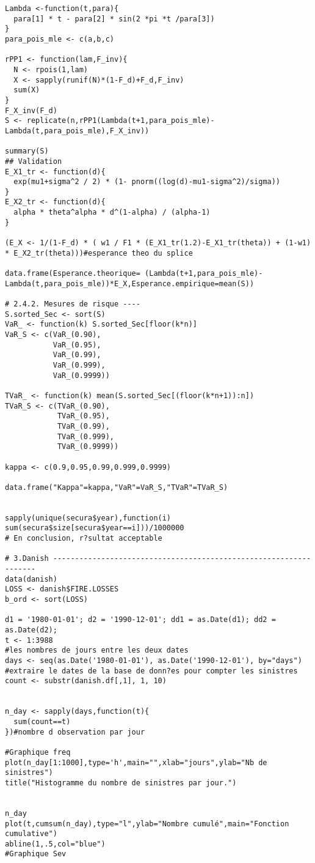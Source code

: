 \begin{verbatim}
Lambda <-function(t,para){
  para[1] * t - para[2] * sin(2 *pi *t /para[3])
}
para_pois_mle <- c(a,b,c)

rPP1 <- function(lam,F_inv){
  N <- rpois(1,lam)
  X <- sapply(runif(N)*(1-F_d)+F_d,F_inv)
  sum(X)
}
F_X_inv(F_d)
S <- replicate(n,rPP1(Lambda(t+1,para_pois_mle)-Lambda(t,para_pois_mle),F_X_inv))

summary(S)
## Validation
E_X1_tr <- function(d){
  exp(mu1+sigma^2 / 2) * (1- pnorm((log(d)-mu1-sigma^2)/sigma))
}
E_X2_tr <- function(d){
  alpha * theta^alpha * d^(1-alpha) / (alpha-1)
}

(E_X <- 1/(1-F_d) * ( w1 / F1 * (E_X1_tr(1.2)-E_X1_tr(theta)) + (1-w1) * E_X2_tr(theta)))#esperance theo du splice

data.frame(Esperance.theorique= (Lambda(t+1,para_pois_mle)-Lambda(t,para_pois_mle))*E_X,Esperance.empirique=mean(S))

# 2.4.2. Mesures de risque ----
S.sorted_Sec <- sort(S)
VaR_ <- function(k) S.sorted_Sec[floor(k*n)]
VaR_S <- c(VaR_(0.90),
           VaR_(0.95),
           VaR_(0.99),
           VaR_(0.999),
           VaR_(0.9999))

TVaR_ <- function(k) mean(S.sorted_Sec[(floor(k*n+1)):n])
TVaR_S <- c(TVaR_(0.90),
            TVaR_(0.95),
            TVaR_(0.99),
            TVaR_(0.999),
            TVaR_(0.9999))

kappa <- c(0.9,0.95,0.99,0.999,0.9999)

data.frame("Kappa"=kappa,"VaR"=VaR_S,"TVaR"=TVaR_S)


sapply(unique(secura$year),function(i) sum(secura$size[secura$year==i]))/1000000
# En conclusion, r?sultat acceptable

# 3.Danish ------------------------------------------------------------------
data(danish)
LOSS <- danish$FIRE.LOSSES
b_ord <- sort(LOSS)

d1 = '1980-01-01'; d2 = '1990-12-01'; dd1 = as.Date(d1); dd2 = as.Date(d2); 
t <- 1:3988
#les nombres de jours entre les deux dates
days <- seq(as.Date('1980-01-01'), as.Date('1990-12-01'), by="days")
#extraire le dates de la base de donn?es pour compter les sinistres
count <- substr(danish.df[,1], 1, 10)


n_day <- sapply(days,function(t){
  sum(count==t)  
})#nombre d observation par jour 

#Graphique freq
plot(n_day[1:1000],type='h',main="",xlab="jours",ylab="Nb de sinistres")
title("Histogramme du nombre de sinistres par jour.")


n_day
plot(t,cumsum(n_day),type="l",ylab="Nombre cumulé",main="Fonction cumulative")
abline(1,.5,col="blue")
#Graphique Sev



\end{verbatim}

